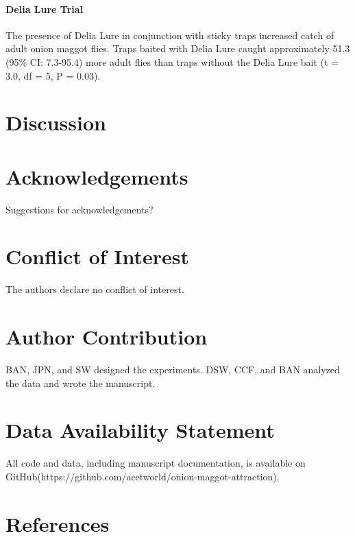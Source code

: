\documentclass[alpha-refs]{wiley-article}
\begin{document}
\paragraph{Delia Lure Trial} The presence of Delia Lure in conjunction with sticky traps increased catch of adult onion maggot flies.  Traps baited with Delia Lure caught approximately 51.3 (95\% CI: 7.3-95.4) more adult flies than traps without the Delia Lure bait (t = 3.0, df = 5, P = 0.03).


\section{Discussion}


\section*{Acknowledgements}
Suggestions for acknowledgements?

\section*{Conflict of Interest}
The authors declare no conflict of interest.  

\section*{Author Contribution}
BAN, JPN, and SW designed the experiments.  DSW, CCF, and BAN analyzed the data and wrote the manuscript.  


\section*{Data Availability Statement}
All code and data, including manuscript documentation, is available on GitHub(https://github.com/acetworld/onion-maggot-attraction).



\section{References}




\end{document}
